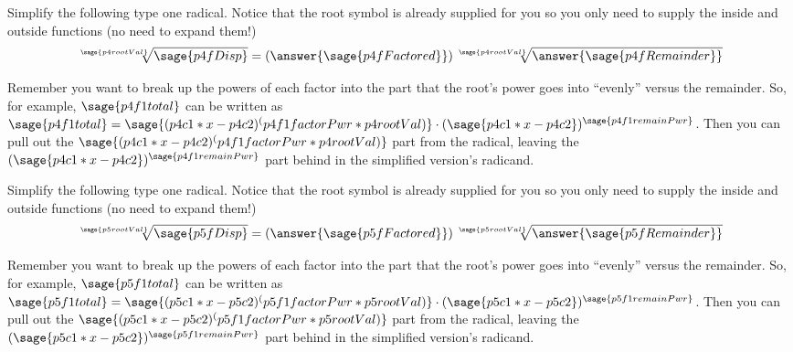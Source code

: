 \documentclass{ximera}
\begin{document}
\begin{problem}
    Simplify the following type one radical. Notice that the root symbol is already supplied for you so you only need to supply the inside and outside functions (no need to expand them!)
    \[
        \sqrt[\sage{p4rootVal}]{\sage{p4fDisp}} = \left(\answer{\sage{p4fFactored}}\right)\sqrt[\sage{p4rootVal}]{\answer{\sage{p4fRemainder}}}
    \]
    \begin{feedback}
        Remember you want to break up the powers of each factor into the part that the root's power goes into ``evenly'' versus the remainder. So, for example, $\sage{p4f1total}$ can be written as $\sage{p4f1total} = \sage{(p4c1*x-p4c2)^(p4f1factorPwr*p4rootVal)}\cdot (\sage{p4c1*x-p4c2})^{\sage{p4f1remainPwr}}$. Then you can pull out the $\sage{(p4c1*x-p4c2)^(p4f1factorPwr*p4rootVal)}$ part from the radical, leaving the $(\sage{p4c1*x-p4c2})^{\sage{p4f1remainPwr}}$ part behind in the simplified version's radicand.
    \end{feedback}
\end{problem}


\begin{problem}
    Simplify the following type one radical. Notice that the root symbol is already supplied for you so you only need to supply the inside and outside functions (no need to expand them!)
    \[
        \sqrt[\sage{p5rootVal}]{\sage{p5fDisp}} = \left(\answer{\sage{p5fFactored}}\right)\sqrt[\sage{p5rootVal}]{\answer{\sage{p5fRemainder}}}
    \]
    \begin{feedback}
        Remember you want to break up the powers of each factor into the part that the root's power goes into ``evenly'' versus the remainder. So, for example, $\sage{p5f1total}$ can be written as $\sage{p5f1total} = \sage{(p5c1*x-p5c2)^(p5f1factorPwr*p5rootVal)}\cdot (\sage{p5c1*x-p5c2})^{\sage{p5f1remainPwr}}$. Then you can pull out the $\sage{(p5c1*x-p5c2)^(p5f1factorPwr*p5rootVal)}$ part from the radical, leaving the $(\sage{p5c1*x-p5c2})^{\sage{p5f1remainPwr}}$ part behind in the simplified version's radicand.
    \end{feedback}
\end{problem}
\end{document}

